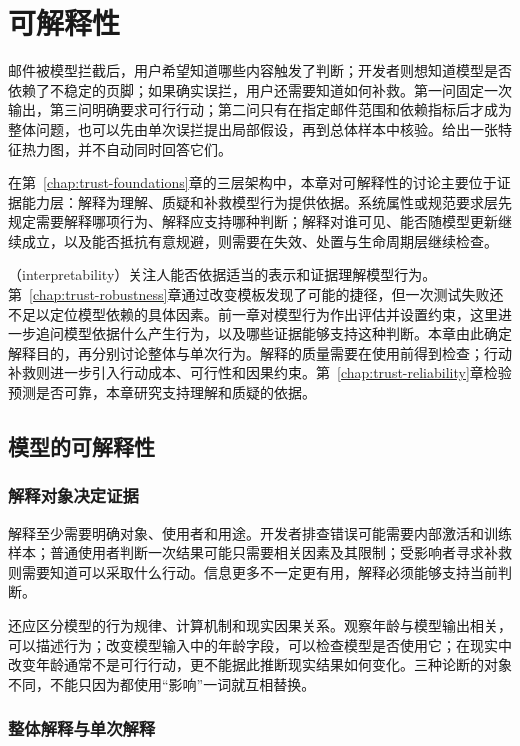 \chapter{可解释性}
\label{chap:trust-interpretability}

邮件被模型拦截后，用户希望知道哪些内容触发了判断；开发者则想知道模型是否依赖了不稳定的页脚；如果确实误拦，用户还需要知道如何补救。第一问固定一次输出，第三问明确要求可行行动；第二问只有在指定邮件范围和依赖指标后才成为整体问题，也可以先由单次误拦提出局部假设，再到总体样本中核验。给出一张特征热力图，并不自动同时回答它们。

在第~\ref{chap:trust-foundations}章的三层架构中，本章对可解释性的讨论主要位于证据能力层：解释为理解、质疑和补救模型行为提供依据。系统属性或规范要求层先规定需要解释哪项行为、解释应支持哪种判断；解释对谁可见、能否随模型更新继续成立，以及能否抵抗有意规避，则需要在失效、处置与生命周期层继续检查。

（interpretability）关注人能否依据适当的表示和证据理解模型行为。第~\ref{chap:trust-robustness}章通过改变模板发现了可能的捷径，但一次测试失败还不足以定位模型依赖的具体因素。前一章对模型行为作出评估并设置约束，这里进一步追问模型依据什么产生行为，以及哪些证据能够支持这种判断。本章由此确定解释目的，再分别讨论整体与单次行为。解释的质量需要在使用前得到检查；行动补救则进一步引入行动成本、可行性和因果约束。第~\ref{chap:trust-reliability}章检验预测是否可靠，本章研究支持理解和质疑的依据。

\section{模型的可解释性}
\label{sec:interpretability-purpose}

\subsection{解释对象决定证据}

解释至少需要明确对象、使用者和用途。开发者排查错误可能需要内部激活和训练样本；普通使用者判断一次结果可能只需要相关因素及其限制；受影响者寻求补救则需要知道可以采取什么行动。信息更多不一定更有用，解释必须能够支持当前判断。

还应区分模型的行为规律、计算机制和现实因果关系。观察年龄与模型输出相关，可以描述行为；改变模型输入中的年龄字段，可以检查模型是否使用它；在现实中改变年龄通常不是可行行动，更不能据此推断现实结果如何变化。三种论断的对象不同，不能只因为都使用“影响”一词就互相替换。

\subsection{整体解释与单次解释}
\label{sec:interpretability-global-local}

